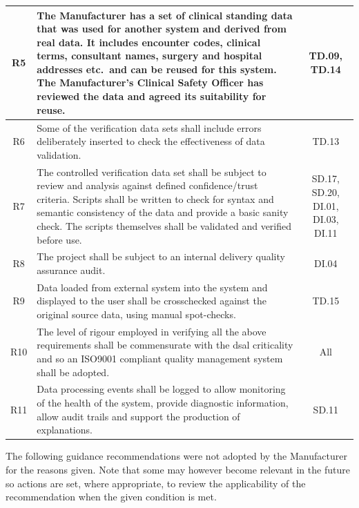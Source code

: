 \begin{longtable}{|C{}|L{}|C{}|}
  \hline
  R5 & The Manufacturer has a set of clinical standing data that was used for another system and derived from real data.
  It includes encounter codes, clinical terms, consultant names, surgery and hospital addresses etc.\ and can be reused for this system. The Manufacturer's Clinical Safety Officer has reviewed the data and agreed its suitability for reuse. & TD.09, TD.14\\
  \hline
  R6 & Some of the verification data sets shall include errors deliberately inserted to check the effectiveness of data validation. & TD.13\\
  \hline
  R7 & The controlled verification data set shall be subject to review and analysis against defined confidence/trust criteria. Scripts shall be written to check for syntax and semantic \gls{consistency} of the data and provide a basic sanity check. The scripts themselves shall be validated and verified before use. & SD.17, SD.20, DI.01, DI.03, DI.11\\
  \hline
  R8 & The project shall be subject to an internal delivery quality assurance audit. & DI.04\\
  \hline
  R9 & Data loaded from external system into the system and displayed to the user shall be crosschecked against the original source data, using manual spot-checks. & TD.15\\
  \hline
  R10 & The level of rigour employed in verifying all the above requirements shall be commensurate with the \gls{dsal} \gls{criticality} and so an ISO9001 compliant quality management system shall be adopted. & All\\
  \hline
  R11 & Data processing events shall be logged to allow monitoring of the health of the system, provide diagnostic information, allow audit trails and support the production of explanations. & SD.11
  \\
  \hline
\end{longtable}

The following guidance recommendations were not adopted by the Manufacturer for the reasons given. Note that some may however become relevant in the future so actions are set, where appropriate, to review the applicability of the recommendation when the given condition is met.

